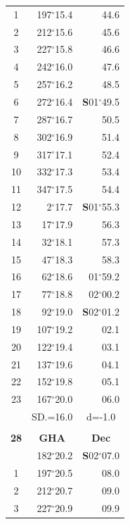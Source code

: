 \documentclass[10pt, a4paper]{report}
\begin{document}
\begin{scriptsize}
\begin{tabular*}{0.2\textwidth}[t]{@{\extracolsep{\fill}}|c|rr|}
1 & 197$^\circ$15.4 & 44.6\\
2 & 212$^\circ$15.6 & 45.6\\
3 & 227$^\circ$15.8 & \raisebox{0.24ex}{\boldmath$\cdot$~\boldmath$\cdot$~~}46.6\\
4 & 242$^\circ$16.0 & 47.6\\
5 & 257$^\circ$16.2 & 48.5\\[2Pt]
6 & 272$^\circ$16.4 & \textbf{S}01$^\circ$49.5\\
7 & 287$^\circ$16.7 & 50.5\\
8 & 302$^\circ$16.9 & 51.4\\
9 & 317$^\circ$17.1 & \raisebox{0.24ex}{\boldmath$\cdot$~\boldmath$\cdot$~~}52.4\\
10 & 332$^\circ$17.3 & 53.4\\
11 & 347$^\circ$17.5 & 54.4\\[2Pt]
12 & 2$^\circ$17.7 & \textbf{S}01$^\circ$55.3\\
13 & 17$^\circ$17.9 & 56.3\\
14 & 32$^\circ$18.1 & 57.3\\
15 & 47$^\circ$18.3 & \raisebox{0.24ex}{\boldmath$\cdot$~\boldmath$\cdot$~~}58.3\\
16 & 62$^\circ$18.6 & 01$^\circ$59.2\\
17 & 77$^\circ$18.8 & 02$^\circ$00.2\\[2Pt]
18 & 92$^\circ$19.0 & \textbf{S}02$^\circ$01.2\\
19 & 107$^\circ$19.2 & 02.1\\
20 & 122$^\circ$19.4 & 03.1\\
21 & 137$^\circ$19.6 & \raisebox{0.24ex}{\boldmath$\cdot$~\boldmath$\cdot$~~}04.1\\
22 & 152$^\circ$19.8 & 05.1\\
23 & 167$^\circ$20.0 & 06.0\\
\hline
\rule{0pt}{2.4ex} & \multicolumn{1}{c}{SD.=16.0} & \multicolumn{1}{c|}{d=-1.0}\\
\hline
\multicolumn{1}{c}{}\\[-0.5ex]\hline
\multicolumn{1}{|c|}{\rule{0pt}{2.6ex}\textbf{28}} & \multicolumn{1}{c}{\textbf{GHA}} & \multicolumn{1}{c|}{\textbf{Dec}}\\
\hline\rule{0pt}{2.6ex}\noindent
0 & 182$^\circ$20.2 & \textbf{S}02$^\circ$07.0\\
1 & 197$^\circ$20.5 & 08.0\\
2 & 212$^\circ$20.7 & 09.0\\
3 & 227$^\circ$20.9 & \raisebox{0.24ex}{\boldmath$\cdot$~\boldmath$\cdot$~~}09.9\\

\end{tabular*}
\end{scriptsize}
\end{document}
